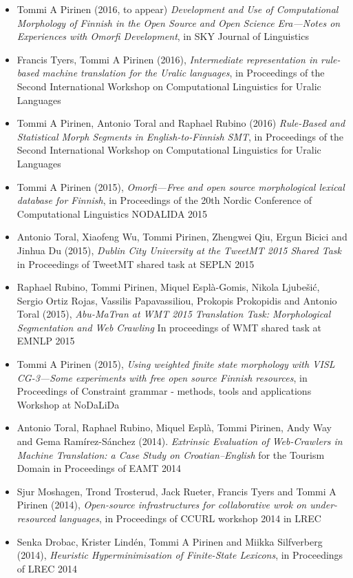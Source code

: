 \documentclass[a4paper]{article}
\begin{document}
\begin{itemize}
\item Tommi A Pirinen (2016, to appear) \textit{Development and Use of Computational Morphology of Finnish in the Open Source and Open Science Era---Notes on Experiences with Omorfi Development}, in SKY Journal of Linguistics
\item Francis Tyers, Tommi A Pirinen (2016), \textit{Intermediate representation in rule-based machine translation for the Uralic languages}, in  Proceedings of the Second International Workshop on Computational Linguistics for Uralic Languages
\item Tommi A Pirinen, Antonio Toral and Raphael Rubino (2016) \textit{Rule-Based and Statistical Morph Segments in English-to-Finnish SMT}, in Proceedings of the Second International Workshop on Computational Linguistics for Uralic Languages
\item Tommi A Pirinen (2015), \textit{Omorfi—Free and open source morphological lexical database for Finnish}, in Proceedings of the 20th Nordic Conference of Computational Linguistics NODALIDA 2015
\item Antonio Toral, Xiaofeng Wu, Tommi Pirinen, Zhengwei Qiu, Ergun Bicici and Jinhua Du (2015), \textit{Dublin City University at the TweetMT 2015 Shared Task} in Proceedings of TweetMT shared task at SEPLN 2015
\item Raphael Rubino, Tommi Pirinen, Miquel Esplà-Gomis, Nikola Ljubešić, Sergio Ortiz Rojas, Vassilis Papavassiliou, Prokopis Prokopidis and Antonio Toral (2015), \textit{Abu-MaTran at WMT 2015 Translation Task: Morphological Segmentation and Web Crawling} In proceedings of WMT shared task at EMNLP 2015
\item Tommi A Pirinen (2015), \textit{Using weighted finite state morphology with VISL CG-3—Some experiments with free open source Finnish resources}, in Proceedings of Constraint grammar - methods, tools and applications Workshop at NoDaLiDa
\item Antonio Toral, Raphael Rubino, Miquel Esplà, Tommi Pirinen, Andy Way and Gema Ramírez-Sánchez (2014). \textit{Extrinsic Evaluation of Web-Crawlers in Machine Translation: a Case Study on Croatian–English} for the Tourism Domain in Proceedings of EAMT 2014
\item Sjur Moshagen, Trond Trosterud, Jack Rueter, Francis Tyers and Tommi A Pirinen (2014), \textit{Open-source infrastructures for collaborative wrok on under-resourced languages}, in Proceedings of CCURL workshop 2014 in LREC
\item Senka Drobac, Krister Lindén, Tommi A Pirinen and Miikka Silfverberg (2014), \textit{Heuristic Hyperminimisation of Finite-State Lexicons}, in Proceedings of LREC 2014

\end{itemize}
\end{document}
